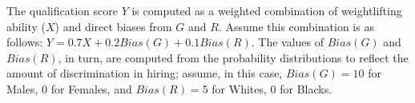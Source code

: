 \begin{example}
\newcommand{\xA}{80}
\newcommand{\xB}{72}
\newcommand{\xC}{75}
\newcommand{\xD}{78}
\newcommand{\biasGA}{10}
\newcommand{\biasGB}{0}
\newcommand{\biasGC}{10}
\newcommand{\biasGD}{0}
\newcommand{\biasRA}{5}
\newcommand{\biasRB}{0}
\newcommand{\biasRC}{0}
\newcommand{\biasRD}{5}
\newcommand{\deltabiasGA}{8}
\newcommand{\deltabiasGB}{0}
\newcommand{\deltabiasGC}{8}
\newcommand{\deltabiasGD}{0}
\newcommand{\deltabiasRA}{4}
\newcommand{\deltabiasRB}{0}
\newcommand{\deltabiasRC}{0}
\newcommand{\deltabiasRD}{4}
\newcommand{\weightX}{0.7}
\newcommand{\weightG}{0.2}
\newcommand{\weightR}{0.1}
\newcommand{\yA}{\fpeval{round(\xA * \weightX + \biasGA * \weightG + \biasRA * \weightR, 1)}}
\newcommand{\yB}{\fpeval{round(\xB * \weightX + \biasGB * \weightG + \biasRB * \weightR, 1)}}
\newcommand{\yC}{\fpeval{round(\xC * \weightX + \biasGC * \weightG + \biasRC * \weightR, 1)}}
\newcommand{\yD}{\fpeval{round(\xD * \weightX + \biasGD * \weightG + \biasRD * \weightR, 1)}}
\newcommand{\xpA}{\fpeval{round(\xA - \deltabiasGA - \deltabiasRA, 1)}}
\newcommand{\xpB}{\fpeval{round(\xB - \deltabiasGB - \deltabiasRB, 1)}}
\newcommand{\xpC}{\fpeval{round(\xC - \deltabiasGC - \deltabiasRC, 1)}}
\newcommand{\xpD}{\fpeval{round(\xD - \deltabiasGD - \deltabiasRD, 1)}}
\newcommand{\ypA}{\fpeval{round(\xpA * \weightX + \biasGA * \weightG + \biasRA * \weightR, 1)}}
\newcommand{\ypB}{\fpeval{round(\xpB * \weightX + \biasGB * \weightG + \biasRB * \weightR, 1)}}
\newcommand{\ypC}{\fpeval{round(\xpC * \weightX + \biasGC * \weightG + \biasRC * \weightR, 1)}}
\newcommand{\ypD}{\fpeval{round(\xpD * \weightX + \biasGD * \weightG + \biasRD * \weightR, 1)}}

The qualification score $Y$ is computed as a weighted combination of weightlifting ability ($X$) and direct biases from $G$ and $R$. Assume this combination is as follows: \( Y=\weightX X+\weightG Bias(G)+ \weightR Bias(R) \).
The values of $Bias(G)$ and $Bias(R)$, in turn, are computed from the probability distributions to reflect the amount of discrimination in hiring; assume, in this case, $Bias(G)=\biasGA$ for Males, $\biasGB$ for Females, and $Bias(R)=\biasRA$ for Whites, $\biasRB$ for Blacks.


\end{example}
